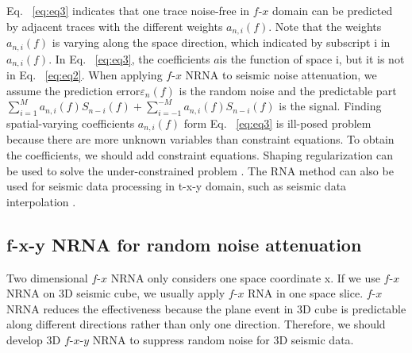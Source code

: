 Eq. ~\ref{eq:eq3} indicates that one trace noise-free in $f$-$x$ domain can be predicted by 
adjacent traces with the different weights ${{a}_{n,i}}(f)$. Note that the 
weights ${{a}_{n,i}}(f)$ is varying along the space direction, which 
indicated by subscript i in ${{a}_{n,i}}(f)$. In Eq. ~\ref{eq:eq3}, the coefficients $a$is 
the function of space i, but it is not in Eq. ~\ref{eq:eq2}. When applying $f$-$x$ NRNA to seismic 
noise attenuation, we assume the prediction error${{\varepsilon }_{n}}(f)$ is the 
random noise and the predictable part $\sum\limits_{i=1}^{M}{{{a}_{n,i}}(f){{S}_{n-i}}(f)}+\sum\limits_{i=-1}^{-M}{{{a}_{n,i}}(f){{S}_{n-i}}(f)}$
is the signal. Finding spatial-varying coefficients ${{a}_{n,i}}(f)$ form Eq. ~\ref{eq:eq3} 
is ill-posed problem because there are more unknown variables than constraint equations. To obtain the 
coefficients, we should add constraint equations. Shaping regularization \cite[]{Fomel2009} 
can be used to solve the under-constrained problem \cite[]{Liu2012}. The RNA method 
can also be used for seismic data processing in t-x-y domain, such as seismic data 
interpolation \cite[]{Liu2011}.

 \subsection{f-x-y NRNA for random noise attenuation}

Two dimensional $f$-$x$ NRNA only considers one space coordinate x. If we use $f$-$x$ 
NRNA on 3D seismic cube, we usually apply $f$-$x$ RNA in one space slice. $f$-$x$ NRNA 
reduces the effectiveness because the plane event in 3D cube is predictable along 
different directions rather than only one direction. Therefore, we should develop 
3D $f$-$x$-$y$ NRNA to suppress random noise for 3D seismic data.





